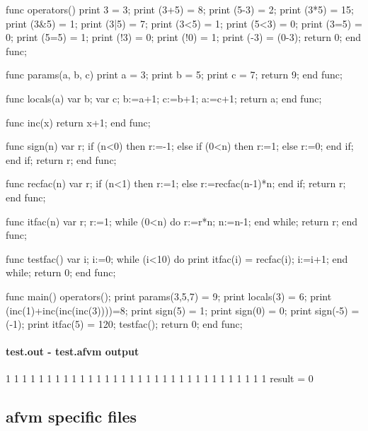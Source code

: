 \documentclass[10pt,english]{article}
\begin{document}
\nwenddocs{}\endmoddef
func operators()
  print 3 = 3;
  print (3+5) = 8;
  print (5-3) = 2;
  print (3*5) = 15;
  print (3&5) = 1;
  print (3|5) = 7;
  print (3<5) = 1;
  print (5<3) = 0;
  print (3=5) = 0;
  print (5=5) = 1;
  print (!3) = 0;
  print (!0) = 1;
  print (-3) = (0-3);
  return 0;
end func;

func params(a, b, c)
  print a = 3;
  print b = 5;
  print c = 7;
  return 9;
end func;

func locals(a)
  var b;
  var c;
  b:=a+1;
  c:=b+1;
  a:=c+1;
  return a;
end func;

func inc(x)
  return x+1;
end func;

func sign(n)
  var r;
  if (n<0) then
    r:=-1;
  else
    if (0<n) then
      r:=1;
    else
      r:=0;
    end if;
  end if;
  return r;
end func;

func recfac(n)
  var r;
  if (n<1) then
    r:=1;
  else
    r:=recfac(n-1)*n;
  end if;
  return r;
end func;

func itfac(n)
  var r;
  r:=1;
  while (0<n) do
    r:=r*n;
    n:=n-1;
  end while;
  return r;
end func;

func testfac()
  var i;
  i:=0;
  while (i<10) do
    print itfac(i) = recfac(i);
    i:=i+1;
  end while;
  return 0;
end func;

func main()
  operators();
  print params(3,5,7) = 9;
  print locals(3) = 6;
  print (inc(1)+inc(inc(inc(3))))=8;
  print sign(5) = 1;
  print sign(0) = 0;
  print sign(-5) = (-1);
  print itfac(5) = 120;
  testfac();
  return 0;
end func;
\nwendcode{}\nwdocspar


\paragraph{test.out - test.afvm output}

\nwenddocs{}
1
1
1
1
1
1
1
1
1
1
1
1
1
1
1
1
1
1
1
1
1
1
1
1
1
1
1
1
1
1
1
1
result = 0
\nwendcode{}\nwdocspar


\subsection{afvm specific files}
\end{document}
